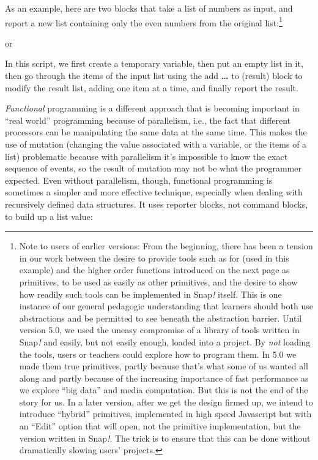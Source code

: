 As an example, here are two blocks that take a list of numbers as input,
and report a new list containing only the even numbers from the original
list:\footnote{Note to users of earlier versions: From the beginning,
  there has been a tension in our work between the desire to provide
  tools such as for (used in this example) and the higher order
  functions introduced on the next page as primitives, to be used as
  easily as other primitives, and the desire to show how readily such
  tools can be implemented in Snap\emph{!} itself. This is one instance
  of our general pedagogic understanding that learners should both use
  abstractions and be permitted to see beneath the abstraction barrier.
  Until version 5.0, we used the uneasy compromise of a library of tools
  written in Snap\emph{!} and easily, but not easily enough, loaded into
  a project. By \emph{not} loading the tools, users or teachers could
  explore how to program them. In 5.0 we made them true primitives,
  partly because that's what some of us wanted all along and partly
  because of the increasing importance of fast performance as we explore
  ``big data'' and media computation. But this is not the end of the
  story for us. In a later version, after we get the design firmed up,
  we intend to introduce ``hybrid'' primitives, implemented in high
  speed Javascript but with an ``Edit'' option that will open, not the
  primitive implementation, but the version written in Snap\emph{!}. The
  trick is to ensure that this can be done without dramatically slowing
  users' projects.}

or

In this script, we first create a temporary variable, then put an empty
list in it, then go through the items of the input list using the add
\textbf{\ldots{}} to (result) block to modify the result list, adding
one item at a time, and finally report the result.

\emph{Functional} programming is a different approach that is becoming
important in ``real world'' programming because of parallelism, i.e.,
the fact that different processors can be manipulating the same data at
the same time. This makes the use of mutation (changing the value
associated with a variable, or the items of a list) problematic because
with parallelism it's impossible to know the exact sequence of events,
so the result of mutation may not be what the programmer expected. Even
without parallelism, though, functional programming is sometimes a
simpler and more effective technique, especially when dealing with
recursively defined data structures. It uses reporter blocks, not
command blocks, to build up a list value:

